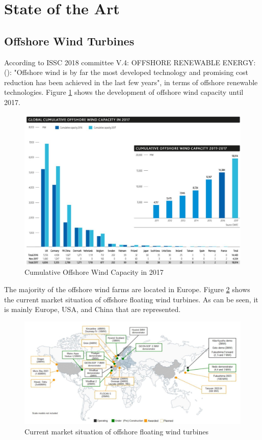 \section{State of the Art}
\subsection{Offshore Wind Turbines}
According to ISSC 2018 committee V.4: OFFSHORE RENEWABLE ENERGY: (\cite{Gao2018}): "Offshore wind is by far the most developed technology and
promising cost reduction has been achieved in the last few years", in terms of offshore renewable technologies. Figure \ref{fig:sit17} shows the development of offshore wind capacity until 2017. 

\begin{figure}[H]
\centering
\includegraphics[scale=0.8]{figures/sit17}
\caption[$\; \:$Cumulative Offshore Wind Capacity in 2017]{Cumulative Offshore Wind Capacity in 2017 \cite{GWEC2018}}
 \label{fig:sit17}
\end{figure}

\noindent The majority of the offshore wind farms are located in Europe. Figure \ref{fig:world} shows the current market situation of offshore floating wind turbines. As can be seen, it is mainly Europe, USA, and China that are represented. 


\begin{figure}[H]
\centering
\includegraphics[scale=0.54]{figures/world}
\caption[$\; \:$Current market situation of offshore floating wind turbines]{Current market situation of offshore floating wind turbines \cite{Gao2018}}
 \label{fig:world}
\end{figure}

